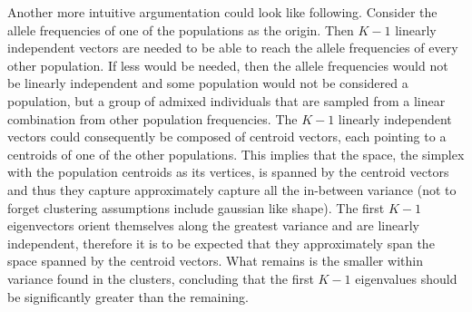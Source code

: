 \documentclass[a4paper, 11pt]{article}
\begin{document}
Another more intuitive argumentation could look like following. Consider the allele frequencies of one of the populations as the origin. Then $K-1$ linearly independent vectors are needed to be able to reach the allele frequencies of every other population. If less would be needed, then the allele frequencies would not be linearly independent and some population would not be considered a population, but a group of admixed individuals that are sampled from a linear combination from other population frequencies. The $K-1$ linearly independent vectors could consequently be composed of centroid vectors, each pointing to a centroids of one of the other populations. This implies that the space, the simplex with the population centroids as its vertices, is spanned by the centroid vectors and thus they capture approximately capture all the in-between variance (not to forget clustering assumptions include gaussian like shape). The first $K-1$ eigenvectors orient themselves along the greatest variance and are linearly independent, therefore it is to be expected that they approximately span the space spanned by the centroid vectors. What remains is the smaller within variance found in the clusters, concluding that the first $K-1$ eigenvalues should be significantly greater than the remaining.\\
\end{document}
